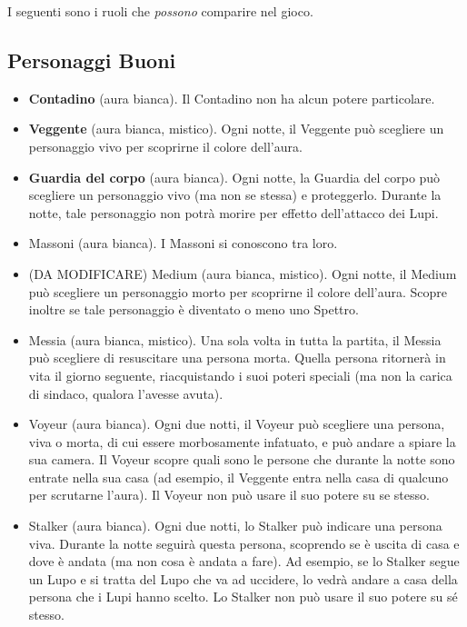 \documentclass[a4paper,10pt]{article}
\begin{document}
I seguenti sono i ruoli che \emph{possono} comparire nel gioco.


\subsection*{Personaggi Buoni}

\begin{itemize}
 \item {\bf Contadino} (aura bianca). Il Contadino non ha alcun potere particolare.
 
 \item {\bf Veggente} (aura bianca, mistico). Ogni notte, il Veggente può scegliere un personaggio vivo per scoprirne il colore dell'aura.

 \item {\bf Guardia del corpo} (aura bianca). Ogni notte, la Guardia del corpo può scegliere un personaggio vivo (ma non se stessa) e proteggerlo. Durante la notte, tale personaggio non potrà morire per effetto dell'attacco dei Lupi.
 
 \item Massoni (aura bianca). I Massoni si conoscono tra loro.
 
 \item (DA MODIFICARE) Medium (aura bianca, mistico). Ogni notte, il Medium può scegliere un personaggio morto per scoprirne il colore dell'aura. Scopre inoltre se tale personaggio è diventato o meno uno Spettro.

 \item Messia (aura bianca, mistico). Una sola volta in tutta la partita, il Messia può scegliere di resuscitare una persona morta. Quella persona ritornerà in vita il giorno seguente, riacquistando i suoi poteri speciali (ma non la carica di sindaco, qualora l'avesse avuta).

 \item Voyeur (aura bianca). Ogni due notti, il Voyeur può scegliere una persona, viva o morta, di cui essere morbosamente infatuato, e può andare a spiare la sua camera. Il Voyeur scopre quali sono le persone che durante la notte sono entrate nella sua casa (ad esempio, il Veggente entra nella casa di qualcuno per scrutarne l'aura).
 Il Voyeur non può usare il suo potere su se stesso.

 \item Stalker (aura bianca). Ogni due notti, lo Stalker può indicare una persona viva. Durante la notte seguirà questa persona, scoprendo se è uscita di casa e dove è andata (ma non cosa è andata a fare).
 Ad esempio, se lo Stalker segue un Lupo e si tratta del Lupo che va ad uccidere, lo vedrà andare a casa della persona che i Lupi hanno scelto.
 Lo Stalker non può usare il suo potere su sé stesso.

 
\end{itemize}
\end{document}
